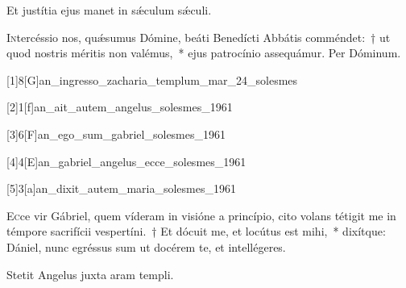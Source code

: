 \documentclass[vesperale_romanum.tex]{subfiles}
\begin{document}
\rr Et justítia ejus manet in sǽculum sǽculi.


\commferiae

\myrule

\newpage



\duplexmajus

\oratio

\lettrine{I}{n}tercéssio nos, quǽsumus Dómine, beáti Benedí\-cti Abbátis comméndet:~† ut quod nostris méritis non valémus,~* ejus patrocínio assequámur. Per Dóminum.

\commferiae

\myrule


\duplexmajus


[1]{8}[G]{an_ingresso_zacharia_templum_mar_24_solesmes}

[2]{1}[f]{an_ait_autem_angelus_solesmes_1961}
 
 [3]{6}[F]{an_ego_sum_gabriel_solesmes_1961}
 
 [4]{4}[E]{an_gabriel_angelus_ecce_solesmes_1961}

[5]{3}[a]{an_dixit_autem_maria_solesmes_1961}


\lettrine{E}{c}ce vir Gábriel, quem víderam in visióne a princípio, cito volans tétigit me in témpore sacrifícii vespertíni.~† Et dócuit me, et locútus est mihi,~* dixítque: Dániel, nunc egréssus sum ut docérem te, et intellégeres.

\hymnus


\vv Stetit Angelus juxta aram templi.
\end{document}
